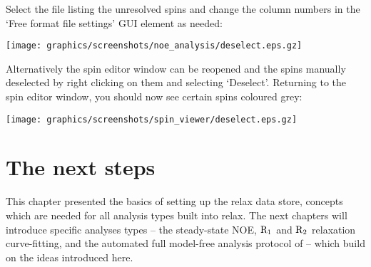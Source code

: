Select the file listing the unresolved spins and change the column numbers in the `Free format file settings' GUI element as needed: 

\begin{minipage}[h]{\linewidth}
\centerline{\texttt{[image: graphics/screenshots/noe\_analysis/deselect.eps.gz]}}
\end{minipage}

Alternatively the spin editor window can be reopened and the spins manually deselected by right clicking on them and selecting `Deselect'.  Returning to the spin editor window, you should now see certain spins coloured grey:

\begin{minipage}[h]{\linewidth}
\centerline{\texttt{[image: graphics/screenshots/spin\_viewer/deselect.eps.gz]}}
\end{minipage}




\section{The next steps}

This chapter presented the basics of setting up the relax data store, concepts which are needed for all analysis types built into relax.  The next chapters will introduce specific analyses types -- the steady-state NOE, $\mathrm{R}_1$ and $\mathrm{R}_2$ relaxation curve-fitting, and the automated full model-free analysis protocol of \citet{dAuvergneGooley07,dAuvergneGooley08b} -- which build on the ideas introduced here.
